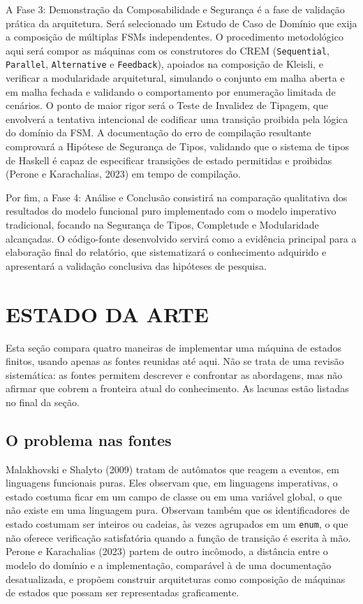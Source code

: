 \documentclass[12pt,a4paper]{article}
\begin{document}
A Fase 3: Demonstração da Composabilidade e Segurança é a fase de validação prática da arquitetura. Será selecionado um Estudo de Caso de Domínio que exija a composição de múltiplas FSMs independentes. O procedimento metodológico aqui será compor as máquinas com os construtores do CREM (\texttt{Sequential}, \texttt{Parallel}, \texttt{Alternative} e \texttt{Feedback}), apoiados na composição de Kleisli, e verificar a modularidade arquitetural, simulando o conjunto em malha aberta e em malha fechada e validando o comportamento por enumeração limitada de cenários. O ponto de maior rigor será o Teste de Invalidez de Tipagem, que envolverá a tentativa intencional de codificar uma transição proibida pela lógica do domínio da FSM. A documentação do erro de compilação resultante comprovará a Hipótese de Segurança de Tipos, validando que o sistema de tipos de Haskell é capaz de especificar transições de estado permitidas e proibidas (Perone e Karachalias, 2023) em tempo de compilação.

Por fim, a Fase 4: Análise e Conclusão consistirá na comparação qualitativa dos resultados do modelo funcional puro implementado com o modelo imperativo tradicional, focando na Segurança de Tipos, Completude e Modularidade alcançadas. O código-fonte desenvolvido servirá como a evidência principal para a elaboração final do relatório, que sistematizará o conhecimento adquirido e apresentará a validação conclusiva das hipóteses de pesquisa.

\section{ESTADO DA ARTE}

Esta seção compara quatro maneiras de implementar uma máquina de estados finitos, usando apenas as fontes reunidas até aqui. Não se trata de uma revisão sistemática: as fontes permitem descrever e confrontar as abordagens, mas não afirmar que cobrem a fronteira atual do conhecimento. As lacunas estão listadas no final da seção.

\subsection{O problema nas fontes}

Malakhovski e Shalyto (2009) tratam de autômatos que reagem a eventos, em linguagens funcionais puras. Eles observam que, em linguagens imperativas, o estado costuma ficar em um campo de classe ou em uma variável global, o que não existe em uma linguagem pura. Observam também que os identificadores de estado costumam ser inteiros ou cadeias, às vezes agrupados em um \texttt{enum}, o que não oferece verificação satisfatória quando a função de transição é escrita à mão. Perone e Karachalias (2023) partem de outro incômodo, a distância entre o modelo do domínio e a implementação, comparável à de uma documentação desatualizada, e propõem construir arquiteturas como composição de máquinas de estados que possam ser representadas graficamente.
\end{document}
